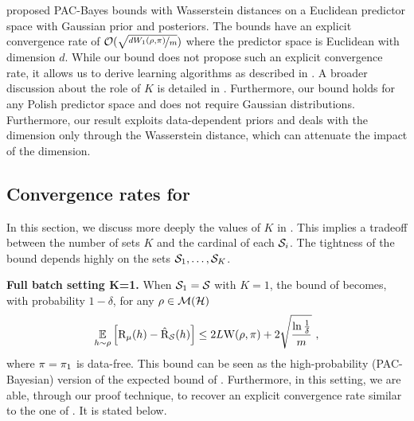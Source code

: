 \documentclass{article}
\begin{document}
 \cite[Corollary 10]{haddouche2023wasserstein} proposed PAC-Bayes bounds with Wasserstein distances on a Euclidean predictor space with Gaussian prior and posteriors. 
 The bounds have an explicit convergence rate of $\Ocal({\sqrt{\nicefrac{d W_1(\Q,\P)}{m}}})$ where the predictor space is Euclidean with dimension $d$.
 While our bound does not propose such an explicit convergence rate, it allows us to derive learning algorithms as described in . 
 A broader discussion about the role of $K$ is detailed in .
 Furthermore, our bound holds for any Polish predictor space and does not require Gaussian distributions.
 Furthermore, our result exploits data-dependent priors and deals with the dimension only through the Wasserstein distance, which can attenuate the impact of the dimension. 

\subsection{Convergence rates for }
\label{sec:discussion-supervised-nnl}

In this section, we discuss more deeply the values of $K$ in . 
This implies a tradeoff between the number of sets $K$ and the cardinal of each $\S_i$.
The tightness of the bound depends highly on the sets $\S_1, \dots, \S_K$.

\textbf{Full batch setting K=1.} When $\S_1=\S$ with $K=1$, the bound of  becomes, with probability $1-\delta$, for any $\Q\in\Mcal(\H)$
\begin{align*}
 \EE_{h\sim\Q}\Big[ \Risk_{\D}(h) - \Riskhat_{\S}(h) \Big] \le 2L\W(\Q, \P) + 2\sqrt{\frac{\ln\frac{1}{\delta}}{m}}\ ,
\end{align*}
where $\P=\P_1$ is data-free.
This bound can be seen as the high-probability (PAC-Bayesian) version of the expected bound of \cite{wang2019information}.
Furthermore, in this setting, we are able, through our proof technique, to recover an explicit convergence rate similar to the one of \cite[][Theorem 12]{amit2022integral}. It is stated below.
\end{document}
